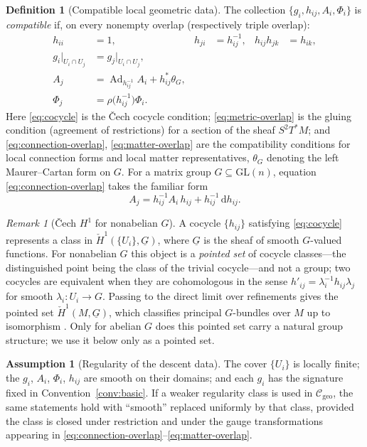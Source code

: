 \documentclass[11pt,a4paper]{article}
\theoremstyle{plain}
\theoremstyle{definition}
\newtheorem{definition}[theorem]{Definition}
\newtheorem{assumption}[theorem]{Assumption}
\theoremstyle{remark}
\newtheorem{remark}[theorem]{Remark}
\newcommand{\Cgeo}{\mathcal{C}_{\mathrm{geo}}}
\newcommand{\Ad}{\operatorname{Ad}}
\begin{document}
\begin{definition}[Compatible local geometric data]
\label{def:compatible}
The collection $\{g_i,h_{ij},A_i,\Phi_i\}$ is \emph{compatible} if, on every nonempty overlap
(respectively triple overlap):
\begin{align}
\label{eq:cocycle}
h_{ii}&=1,
&
h_{ji}&=h_{ij}^{-1},
&
h_{ij}h_{jk}&=h_{ik} ,
\\[0.3em]
\label{eq:metric-overlap}
g_i\big|_{U_i\cap U_j} &= g_j\big|_{U_i\cap U_j} ,
\\[0.3em]
\label{eq:connection-overlap}
A_j &= \Ad_{h_{ij}^{-1}}A_i + h_{ij}^{*}\theta_G ,
\\[0.3em]
\label{eq:matter-overlap}
\Phi_j &= \rho\bigl(h_{ij}^{-1}\bigr)\Phi_i .
\end{align}
Here \eqref{eq:cocycle} is the \v{C}ech cocycle condition; \eqref{eq:metric-overlap} is the
gluing condition (agreement of restrictions) for a section of the sheaf $S^2T^*M$; and \eqref{eq:connection-overlap}, \eqref{eq:matter-overlap} are
the compatibility conditions for local connection forms and local matter representatives,
$\theta_G$ denoting the left Maurer--Cartan form on $G$. For a matrix group
$G\subseteq\mathrm{GL}(n)$, equation \eqref{eq:connection-overlap} takes the familiar form
\[
A_j = h_{ij}^{-1}A_i\,h_{ij} + h_{ij}^{-1}\,\mathrm{d}h_{ij} .
\]
\end{definition}

\begin{remark}[\v{C}ech $H^1$ for nonabelian $G$]
\label{rem:cech}
A cocycle $\{h_{ij}\}$ satisfying \eqref{eq:cocycle} represents a class in
$\check H^1(\{U_i\},\underline{G})$, where $\underline{G}$ is the sheaf of smooth $G$-valued
functions. For nonabelian $G$ this object is a \emph{pointed set} of cocycle classes---the
distinguished point being the class of the trivial cocycle---and not a group; two cocycles are
equivalent when they are cohomologous in the sense
$h'_{ij}=\lambda_i^{-1}h_{ij}\lambda_j$ for smooth $\lambda_i\colon U_i\to G$. Passing to the
direct limit over refinements gives the pointed set $\check H^1(M,\underline{G})$, which
classifies principal $G$-bundles over $M$ up to isomorphism \cite{Steenrod}. Only for abelian $G$
does this pointed set carry a natural group structure; we use it below only as a pointed set.
\end{remark}

\begin{assumption}[Regularity of the descent data]
\label{ass:descent-reg}
The cover $\{U_i\}$ is locally finite; the $g_i$, $A_i$, $\Phi_i$, $h_{ij}$ are smooth on their
domains; and each $g_i$ has the signature fixed in Convention~\ref{conv:basic}. If a weaker
regularity class is used in $\Cgeo$, the same statements hold with ``smooth'' replaced uniformly
by that class, provided the class is closed under restriction and under the gauge transformations
appearing in \eqref{eq:connection-overlap}--\eqref{eq:matter-overlap}.
\end{assumption}
\end{document}
